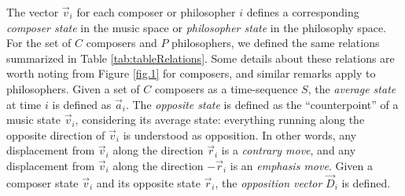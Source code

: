 \documentclass[
 aip,
 jmp,
 amsmath,amssymb,
 reprint,
]{revtex4-1}
\begin{document}
The vector $\vec{v}_i$ for each composer or philosopher $i$ defines a
corresponding \emph{composer state} in the music space or
\emph{philosopher state} in the philosophy space. For the set of $C$
composers and $P$ philosophers, we defined the same relations
summarized in Table \ref{tab:tableRelations}. Some details about these
relations are worth noting from Figure \ref{fig.1} for composers, and
similar remarks apply to philosophers. Given a set of $C$ composers as
a time-sequence $S$, the \emph{average state} at time $i$ is defined
as $\vec{a}_i$. The \emph{opposite state} is defined as the
``counterpoint'' of a music state $\vec{v}_i$, considering its average
state: everything running along the opposite direction of $\vec{v}_i$
is understood as opposition. In other words, any displacement from
$\vec{v}_i$ along the direction $\vec{r}_i$ is a \emph{contrary move},
and any displacement from $\vec{v}_i$ along the direction $-\vec{r}_i$
is an \emph{emphasis move}. Given a composer state $\vec{v}_i$ and its
opposite state $\vec{r}_i$, the \emph{opposition vector} $\vec{D}_i$
is defined.
\end{document}
